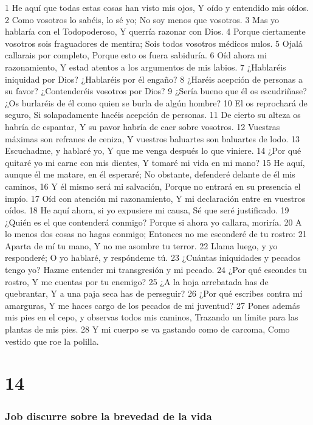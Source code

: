 1 He aquí que todas estas cosas han visto mis ojos,  
Y oído y entendido mis oídos.  
2 Como vosotros lo sabéis, lo sé yo;  
No soy menos que vosotros.  
3 Mas yo hablaría con el Todopoderoso,  
Y querría razonar con Dios.  
4 Porque ciertamente vosotros sois fraguadores de mentira;  
Sois todos vosotros médicos nulos.  
5 Ojalá callarais por completo,  
Porque esto os fuera sabiduría.  
6 Oíd ahora mi razonamiento,  
Y estad atentos a los argumentos de mis labios. 
7 ¿Hablaréis iniquidad por Dios?  
¿Hablaréis por él engaño?  
8 ¿Haréis acepción de personas a su favor?  
¿Contenderéis vosotros por Dios?  
9 ¿Sería bueno que él os escudriñase?  
¿Os burlaréis de él como quien se burla de algún hombre?  
10 El os reprochará de seguro,  
Si solapadamente hacéis acepción de personas.  
11 De cierto su alteza os habría de espantar,  
Y su pavor habría de caer sobre vosotros.  
12 Vuestras máximas son refranes de ceniza,  
Y vuestros baluartes son baluartes de lodo.  
13 Escuchadme, y hablaré yo,  
Y que me venga después lo que viniere.  
14 ¿Por qué quitaré yo mi carne con mis dientes,  
Y tomaré mi vida en mi mano?  
15 He aquí, aunque él me matare, en él esperaré;  
No obstante, defenderé delante de él mis caminos,  
16 Y él mismo será mi salvación,  
Porque no entrará en su presencia el impío.  
17 Oíd con atención mi razonamiento,  
Y mi declaración entre en vuestros oídos.  
18 He aquí ahora, si yo expusiere mi causa,  
Sé que seré justificado.  
19 ¿Quién es el que contenderá conmigo?  
Porque si ahora yo callara, moriría.  
20 A lo menos dos cosas no hagas conmigo;  
Entonces no me esconderé de tu rostro:  
21 Aparta de mí tu mano,  
Y no me asombre tu terror.  
22 Llama luego, y yo responderé;  
O yo hablaré, y respóndeme tú.  
23 ¿Cuántas iniquidades y pecados tengo yo?  
Hazme entender mi transgresión y mi pecado.  
24 ¿Por qué escondes tu rostro,  
Y me cuentas por tu enemigo?  
25 ¿A la hoja arrebatada has de quebrantar,  
Y a una paja seca has de perseguir?  
26 ¿Por qué escribes contra mí amarguras,  
Y me haces cargo de los pecados de mi juventud?  
27 Pones además mis pies en el cepo, y observas todos mis caminos,  
Trazando un límite para las plantas de mis pies. 
28 Y mi cuerpo se va gastando como de carcoma,  
Como vestido que roe la polilla. 

\chapter{14}

\subsection*{Job discurre sobre la brevedad de la vida}  


